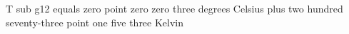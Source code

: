 T sub g12 equals zero point zero zero three degrees Celsius plus two hundred seventy-three point one five three Kelvin
